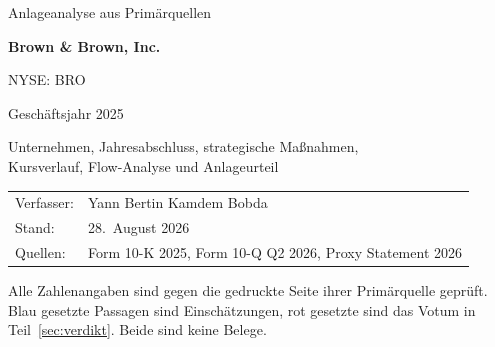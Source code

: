 \begin{titlepage}
\centering
{}
{\large Anlageanalyse aus Prim\"arquellen\par}
\vspace{1.2cm}
{\Huge\bfseries Brown \& Brown, Inc.\par}
\vspace{0.5cm}
{\LARGE NYSE: BRO\par}
\vspace{0.4cm}
{\Large Gesch\"aftsjahr 2025\par}
{\large Unternehmen, Jahresabschluss, strategische Ma{\ss}nahmen,\\
Kursverlauf, Flow-Analyse und Anlageurteil\par}
\begin{tabular}{ll}
Verfasser: & Yann Bertin Kamdem Bobda\\
Stand:     & 28.~August 2026\\
Quellen:   & Form 10-K 2025, Form 10-Q Q2 2026, Proxy Statement 2026\\
\end{tabular}
\par
\vspace{1.2cm}
\begin{minipage}{0.8\linewidth}
\centering\small
Alle Zahlenangaben sind gegen die gedruckte Seite ihrer Prim\"arquelle
gepr\"uft. Blau gesetzte Passagen sind Einsch\"atzungen, rot gesetzte sind
das Votum in Teil~\ref{sec:verdikt}. Beide sind keine Belege.
\end{minipage}
\end{titlepage}
